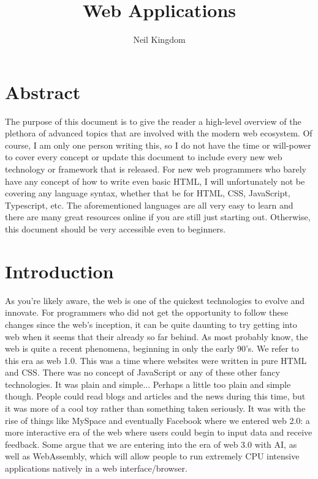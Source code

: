 \documentclass{article}
\title{Web Applications}
\author{Neil Kingdom}
\begin{document}
\begin{titlingpage}

\maketitle

\end{titlingpage}

\newpage

\tableofcontents

\newpage

\section{Abstract}

The purpose of this document is to give the reader a high-level overview of the plethora of advanced topics
that are involved with the modern web ecosystem. Of course, I am only one person writing this, so I do not
have the time or will-power to cover every concept or update this document to include every new web
technology or framework that is released. For new web programmers who barely have any concept of how to write
even basic HTML, I will unfortunately not be covering any language syntax, whether that be for HTML, CSS,
JavaScript, Typescript, etc. The aforementioned languages are all very easy to learn and there are many great
resources online if you are still just starting out. Otherwise, this document should be very accessible even
to beginners.

\section{Introduction}

As you're likely aware, the web is one of the quickest technologies to evolve and innovate. For programmers
who did not get the opportunity to follow these changes since the web's inception, it can be quite daunting to
try getting into web when it seems that their already so far behind. As most probably know, the web is quite a
recent phenomena, beginning in only the early 90's. We refer to this era as web 1.0. This was a time where
websites were written in pure HTML and CSS. There was no concept of JavaScript or any of these other fancy
technologies. It was plain and simple... Perhaps a little too plain and simple though. People could read blogs
and articles and the news during this time, but it was more of a cool toy rather than something taken seriously.
It was with the rise of things like MySpace and eventually Facebook where we entered web 2.0: a more interactive
era of the web where users could begin to input data and receive feedback. Some argue that we are entering into
the era of web 3.0 with AI, as well as WebAssembly, which will allow people to run extremely CPU intensive
applications natively in a web interface/browser.
\end{document}
